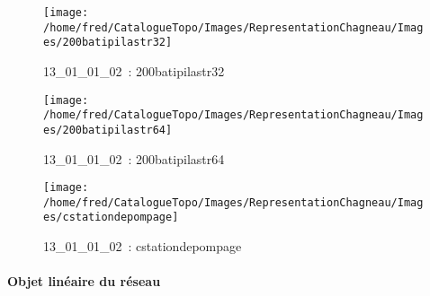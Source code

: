 \documentclass[12pt,titlepage]{book}
\begin{document}
\begin{figure}[h!]
  \begin{minipage}[t]{3cm}
    \begin{center}
      \texttt{[image: /home/fred/CatalogueTopo/Images/RepresentationChagneau/Images/200batipilastr32]}
      \caption[~13\_01\_01\_02]{\small{13\_01\_01\_02~:} \tiny{200batipilastr32}}\label{200batipilastr32}
    \end{center}
  \end{minipage}
  \begin{minipage}[t]{3cm}
    \begin{center}
      \texttt{[image: /home/fred/CatalogueTopo/Images/RepresentationChagneau/Images/200batipilastr64]}
      \caption[~13\_01\_01\_02]{\small{13\_01\_01\_02~:} \tiny{200batipilastr64}}\label{200batipilastr64}
    \end{center}
  \end{minipage}
  \begin{minipage}[t]{3cm}
    \begin{center}
      \texttt{[image: /home/fred/CatalogueTopo/Images/RepresentationChagneau/Images/cstationdepompage]}
      \caption[~13\_01\_01\_02]{\small{13\_01\_01\_02~:} \tiny{cstationdepompage}}\label{cstationdepompage}
    \end{center}
  \end{minipage}
\end{figure}


\paragraph{Objet linéaire du réseau}
\noindent
\vspace{\baselineskip}
\end{document}
